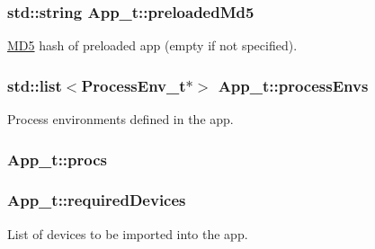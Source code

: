 \subsubsection[{\texorpdfstring{preloaded\+Md5}{preloadedMd5}}]{\setlength{\rightskip}{0pt plus 5cm}std\+::string App\+\_\+t\+::preloaded\+Md5}\hypertarget{struct_app__t_a511b6d392993618d951bd2224516b1fc}{}\label{struct_app__t_a511b6d392993618d951bd2224516b1fc}


\hyperlink{class_m_d5}{M\+D5} hash of preloaded app (empty if not specified). 

\subsubsection[{\texorpdfstring{process\+Envs}{processEnvs}}]{\setlength{\rightskip}{0pt plus 5cm}std\+::list$<${\bf Process\+Env\+\_\+t}$\ast$$>$ App\+\_\+t\+::process\+Envs}\hypertarget{struct_app__t_ab7c3d2143731959cf84154eb8cc98cc7}{}\label{struct_app__t_ab7c3d2143731959cf84154eb8cc98cc7}


Process environments defined in the app. 

\subsubsection[{\texorpdfstring{procs}{procs}}]{ App\+\_\+t\+::procs}\hypertarget{struct_app__t_a9f59b78e78e28eb68ae93570f7e70fbf}{}\label{struct_app__t_a9f59b78e78e28eb68ae93570f7e70fbf}
\subsubsection[{\texorpdfstring{required\+Devices}{requiredDevices}}]{ App\+\_\+t\+::required\+Devices}\hypertarget{struct_app__t_a0189b5b467b6e898f5018f9ac84ad158}{}\label{struct_app__t_a0189b5b467b6e898f5018f9ac84ad158}


List of devices to be imported into the app. 

